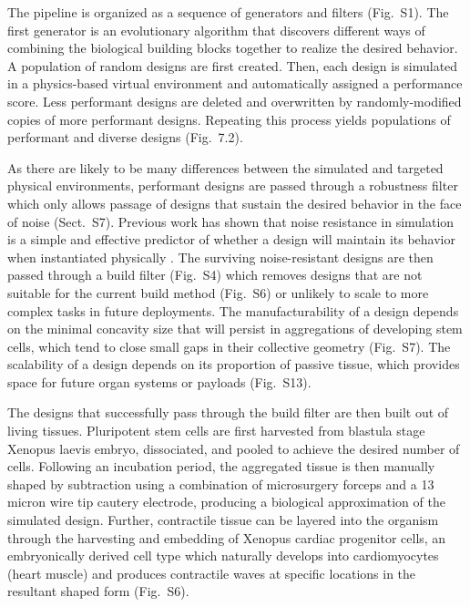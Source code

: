 The pipeline is organized as a sequence of generators and filters (Fig.~S1). 
The first generator is an evolutionary algorithm that discovers different ways of combining the biological building blocks together to realize the desired behavior. 
A population of random designs are first created. 
Then, each design is simulated in a physics-based virtual environment and automatically assigned a performance score. 
Less performant designs are deleted and overwritten by randomly-modified copies of more performant designs. 
Repeating this process yields populations of performant and diverse designs (Fig.~7.2).

As there are likely to be many differences between the simulated and targeted physical environments, performant designs are passed through a robustness filter which only allows passage of designs that sustain the desired behavior in the face of noise (Sect.~S7). 
Previous work has shown that noise resistance in simulation is a simple and effective predictor of whether a design will maintain its behavior when instantiated physically \cite{jakobi1997evolutionary}. 
The surviving noise-resistant designs are then passed through a build filter (Fig.~S4) which removes designs that are not suitable for the current build method (Fig.~S6) or unlikely to scale to more complex tasks in future deployments. 
The manufacturability of a design depends on the minimal concavity size that will persist in aggregations of developing stem cells, which tend to close small gaps in their collective geometry (Fig.~S7). 
The scalability of a design depends on its proportion of passive tissue, which provides space for future organ systems or payloads (Fig.~S13).

The designs that successfully pass through the build filter are then built out of living tissues. 
Pluripotent stem cells are first harvested from blastula stage Xenopus laevis embryo, dissociated, and pooled to achieve the desired number of cells. 
Following an incubation period, the aggregated tissue is then manually shaped by subtraction using a combination of microsurgery forceps and a 13 micron wire tip cautery electrode, producing a biological approximation of the simulated design.
Further, contractile tissue can be layered into the organism through the harvesting and embedding of Xenopus cardiac progenitor cells, an embryonically derived cell type which naturally develops into cardiomyocytes (heart muscle) and produces contractile waves at specific locations in the resultant shaped form (Fig.~S6).

